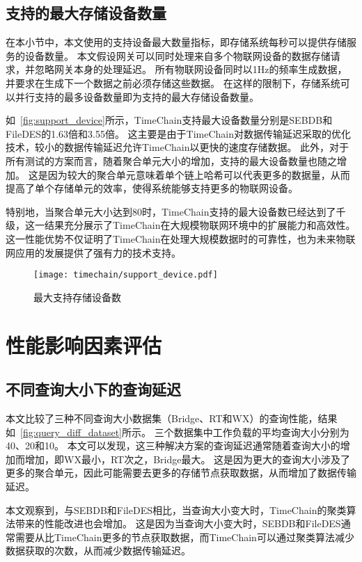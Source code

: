\subsection{支持的最大存储设备数量}
在本小节中，本文使用的支持设备最大数量指标，即存储系统每秒可以提供存储服务的设备数量。
本文假设网关可以同时处理来自多个物联网设备的数据存储请求，并忽略网关本身的处理延迟。
所有物联网设备同时以1Hz的频率生成数据，并要求在生成下一个数据之前必须存储这些数据。
在这样的限制下，存储系统可以并行支持的最多设备数量即为支持的最大存储设备数量。

如~\autoref{fig:support_device}所示，TimeChain支持最大设备数量分别是SEBDB和FileDES的1.63倍和3.55倍。
这主要是由于TimeChain对数据传输延迟采取的优化技术，较小的数据传输延迟允许TimeChain以更快的速度存储数据。
此外，对于所有测试的方案而言，随着聚合单元大小的增加，支持的最大设备数量也随之增加。
这是因为较大的聚合单元意味着单个链上哈希可以代表更多的数据量，从而提高了单个存储单元的效率，使得系统能够支持更多的物联网设备。

特别地，当聚合单元大小达到80时，TimeChain支持的最大设备数已经达到了千级，这一结果充分展示了TimeChain在大规模物联网环境中的扩展能力和高效性。
这一性能优势不仅证明了TimeChain在处理大规模数据时的可靠性，也为未来物联网应用的发展提供了强有力的技术支持。
\begin{figure}[t]
    \centering
    \texttt{[image: timechain/support\_device.pdf]}
    \caption{最大支持存储设备数}
    \label{fig:support_device}
\end{figure}

\section{性能影响因素评估}
\subsection{不同查询大小下的查询延迟}
本文比较了三种不同查询大小数据集（Bridge、RT和WX）的查询性能，结果如~\autoref{fig:query_diff_dataset}所示。
三个数据集中工作负载的平均查询大小分别为40、20和10。
本文可以发现，这三种解决方案的查询延迟通常随着查询大小的增加而增加，即WX最小，RT次之，Bridge最大。
这是因为更大的查询大小涉及了更多的聚合单元，因此可能需要去更多的存储节点获取数据，从而增加了数据传输延迟。

本文观察到，与SEBDB和FileDES相比，当查询大小变大时，TimeChain的聚类算法带来的性能改进也会增加。
这是因为当查询大小变大时，SEBDB和FileDES通常需要从比TimeChain更多的节点获取数据，而TimeChain可以通过聚类算法减少数据获取的次数，从而减少数据传输延迟。

